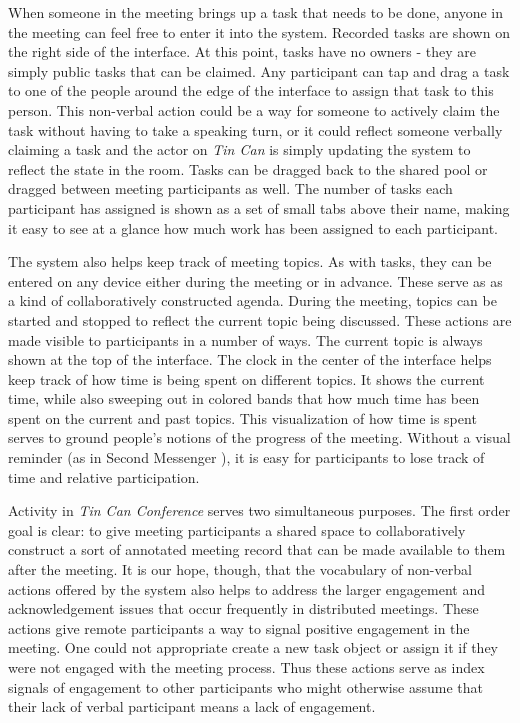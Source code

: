 \documentclass{tufte-handout}
\begin{document}
When someone in the meeting brings up a task that needs to be done, anyone in the meeting can feel free to enter it into the system. Recorded tasks are shown on the right side of the interface. At this point, tasks have no owners - they are simply public tasks that can be claimed. Any participant can tap and drag a task to one of the people around the edge of the interface to assign that task to this person. This non-verbal action could be a way for someone to actively claim the task without having to take a speaking turn, or it could reflect someone verbally claiming a task and the actor on \emph{Tin Can} is simply updating the system to reflect the state in the room. Tasks can be dragged back to the shared pool or dragged between meeting participants as well. The number of tasks each participant has assigned is shown as a set of small tabs above their name, making it easy to see at a glance how much work has been assigned to each participant.

The system also helps keep track of meeting topics. As with tasks, they can be entered on any device either during the meeting or in advance. These serve as as a kind of collaboratively constructed agenda. During the meeting, topics can be started and stopped to reflect the current topic being discussed. These actions are made visible to participants in a number of ways. The current topic is always shown at the top of the interface. The clock in the center of the interface helps keep track of how time is being spent on different topics. It shows the current time, while also sweeping out in colored bands that how much time has been spent on the current and past topics. This visualization of how time is spent serves to ground people's notions of the progress of the meeting. Without a visual reminder (as in Second Messenger \citet{second_messenger}), it is easy for participants to lose track of time and relative participation.

Activity in \emph{Tin Can Conference} serves two simultaneous purposes. The first order goal is clear: to give meeting participants a shared space to collaboratively construct a sort of annotated meeting record that can be made available to them after the meeting. It is our hope, though, that the vocabulary of non-verbal actions offered by the system also helps to address the larger engagement and acknowledgement issues that occur frequently in distributed meetings. These actions give remote participants a way to signal positive engagement in the meeting. One could not appropriate create a new task object or assign it if they were not engaged with the meeting process. Thus these actions serve as index signals of engagement to other participants who might otherwise assume that their lack of verbal participant means a lack of engagement.
\end{document}
